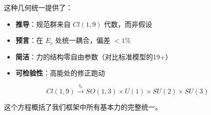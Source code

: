 这种几何统一提供了：
\begin{itemize}
    \item \textbf{推导}：规范群来自 $Cl(1,9)$ 代数，而非假设
    \item \textbf{预言}：在 $E_c$ 处统一耦合，偏差 $<1\%$
    \item \textbf{简洁}：力的结构零自由参数（对比标准模型的19+）
    \item \textbf{可检验性}：高能处的修正跑动
\end{itemize}

\begin{equation}
    \boxed{Cl(1,9) \xrightarrow{\tau_0} SO(1,3) \times U(1) \times SU(2) \times SU(3)}
\end{equation}

这个方程概括了我们框架中所有基本力的完整统一。

